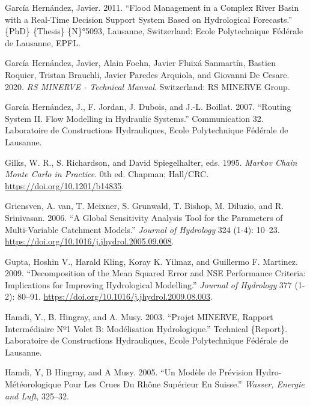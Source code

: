 \documentclass[
  letterpaper,
  DIV=11,
  numbers=noendperiod]{scrreprt}
\newlength{\cslhangindent}
\newlength{\cslentryspacingunit} %
\newenvironment{CSLReferences}[2] %
 {%
  \setlength{\parindent}{0pt}
  \ifodd #1
  \let\oldpar\par
  \def\par{\hangindent=\cslhangindent\oldpar}
  \fi
  \setlength{\parskip}{#2\cslentryspacingunit}
 }%
 {}
\begin{document}
\begin{CSLReferences}{1}{0}
\leavevmode{}%
García Hernández, Javier. 2011. {``Flood Management in a Complex River
Basin with a Real-Time Decision Support System Based on Hydrological
Forecasts.''} \{PhD\} \{Thesis\} \{N\}°5093, Lausanne, Switzerland:
Ecole Polytechnique Fédérale de Lausanne, EPFL.

\leavevmode{}%
García Hernández, Javier, Alain Foehn, Javier Fluixá Sanmartín, Bastien
Roquier, Tristan Brauchli, Javier Paredes Arquiola, and Giovanni De
Cesare. 2020. \emph{{RS} {MINERVE} - {Technical} Manual}. Switzerland:
RS MINERVE Group.

\leavevmode{}%
García Hernández, J., F. Jordan, J. Dubois, and J.-L. Boillat. 2007.
{``Routing {System} {II}. {Flow} Modelling in Hydraulic Systems.''}
Communication 32. Laboratoire de Constructions Hydrauliques, Ecole
Polytechnique Fédérale de Lausanne.

\leavevmode{}%
Gilks, W. R., S. Richardson, and David Spiegelhalter, eds. 1995.
\emph{Markov {Chain} {Monte} {Carlo} in {Practice}}. 0th ed. Chapman;
Hall/CRC. \url{https://doi.org/10.1201/b14835}.

\leavevmode{}%
Griensven, A. van, T. Meixner, S. Grunwald, T. Bishop, M. Diluzio, and
R. Srinivasan. 2006. {``A Global Sensitivity Analysis Tool for the
Parameters of Multi-Variable Catchment Models.''} \emph{Journal of
Hydrology} 324 (1-4): 10--23.
\url{https://doi.org/10.1016/j.jhydrol.2005.09.008}.

\leavevmode{}%
Gupta, Hoshin V., Harald Kling, Koray K. Yilmaz, and Guillermo F.
Martinez. 2009. {``Decomposition of the Mean Squared Error and {NSE}
Performance Criteria: {Implications} for Improving Hydrological
Modelling.''} \emph{Journal of Hydrology} 377 (1-2): 80--91.
\url{https://doi.org/10.1016/j.jhydrol.2009.08.003}.

\leavevmode{}%
Hamdi, Y., B. Hingray, and A. Musy. 2003. {``Projet {MINERVE}, Rapport
Intermédiaire {Nº1} Volet {B}: {Modélisation} Hydrologique.''} Technical
\{Report\}. Laboratoire de Constructions Hydrauliques, Ecole
Polytechnique Fédérale de Lausanne.

\leavevmode{}%
Hamdi, Y, B Hingray, and A Musy. 2005. {``Un Modèle de Prévision
Hydro-Météorologique Pour Les Crues Du {Rhône} Supérieur En {Suisse}.''}
\emph{Wasser, Energie and Luft}, 325--32.


\end{CSLReferences}
\end{document}
